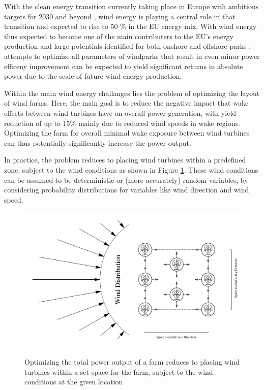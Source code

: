 \documentclass[preprint,12pt]{elsarticle}
\begin{document}
With the clean energy transition currently taking place in Europe with ambitious targets for 2030 and beyond \cite{EU_RE_Targets_2023}, wind energy is playing a central role in that transition and expected to rise to 50 \% in the EU energy mix. \cite{ConsiliumEU_Harnessing_Wind_Power_2024}
With wind energy thus expected to become one of the main contributers to the EU's energy production and large potentials identified for both onshore and offshore parks \cite{EEA_Wind_Energy_Potential_2009}, attempts to optimize all parameters of windparks that result in even minor power efficeny improvement can be expected to yield significant returns in absolute power due to the scale of future wind energy production. 

Within the main wind energy challanges lies the problem of optimizing the layout of wind farms. Here, the main goal is to reduce the negative impact that wake effects between wind turbines have on overall power generation, with yield reduction of up to $15\%$  mainly due to reduced wind speeds in wake regions. Optimizing the farm for overall minimal wake exposure between wind turbines can thus potentially significantly increase the power output. \cite{hou_review_2019} \cite{KIM2024123383} 

In practice, the problem reduces to placing wind turbines within a predefined zone, subject to the wind conditions as shown in Figure \ref{fig:intro_plot}. These wind conditions can be assumed to be deterministic or (more accurately) random variables, by considering probability distributions for variables like wind direction and wind speed.


\begin{figure}[h] 
	\centering
	\includegraphics[width=1\textwidth]{../figures/introduction/intro_plot.png} 
	\caption{Optimizing the total power output of a farm reduces to placing wind turbines within a set space for the farm, subject to the wind conditions at the given location}
	\label{fig:intro_plot}
\end{figure}
\end{document}
